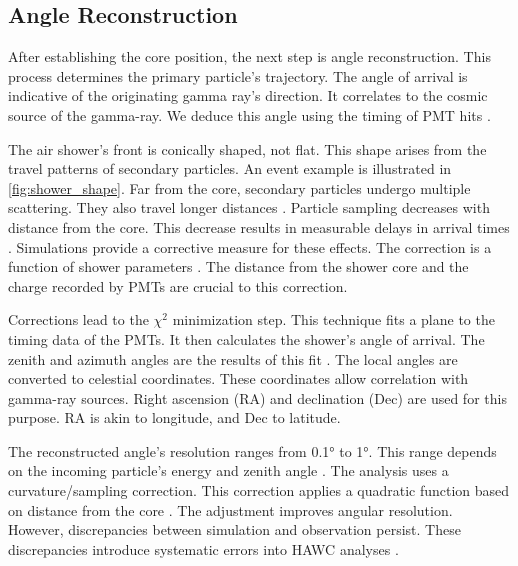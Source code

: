 \subsection{Angle Reconstruction} \label{sec:hawc_angleReco}

After establishing the core position, the next step is angle reconstruction.
This process determines the primary particle's trajectory.
The angle of arrival is indicative of the originating gamma ray's direction.
It correlates to the cosmic source of the gamma-ray.
We deduce this angle using the timing of PMT hits \cite{Abeysekara_2017}.

The air shower's front is conically shaped, not flat.
This shape arises from the travel patterns of secondary particles.
An event example is illustrated in \cref{fig:shower_shape}.
Far from the core, secondary particles undergo multiple scattering.
They also travel longer distances \cite{wcd_Sensitivity}.
Particle sampling decreases with distance from the core.
This decrease results in measurable delays in arrival times \cite{wcd_Sensitivity,Abeysekara_2017}.
Simulations provide a corrective measure for these effects.
The correction is a function of shower parameters \cite{Abeysekara_2017}.
The distance from the shower core and the charge recorded by PMTs are crucial to this correction.

Corrections lead to the $\chi^2$ minimization step.
This technique fits a plane to the timing data of the PMTs.
It then calculates the shower's angle of arrival.
The zenith and azimuth angles are the results of this fit \cite{wcd_Sensitivity}.
The local angles are converted to celestial coordinates.
These coordinates allow correlation with gamma-ray sources.
Right ascension (RA) and declination (Dec) are used for this purpose.
RA is akin to longitude, and Dec to latitude.

The reconstructed angle's resolution ranges from 0.1° to 1°.
This range depends on the incoming particle's energy and zenith angle \cite{wcd_Sensitivity}.
The analysis uses a curvature/sampling correction.
This correction applies a quadratic function based on distance from the core \cite{Abeysekara_2017}.
The adjustment improves angular resolution.
However, discrepancies between simulation and observation persist.
These discrepancies introduce systematic errors into HAWC analyses \cite{Abeysekara_2017}.

